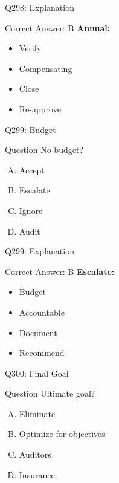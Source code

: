 \documentclass{beamer}
\begin{document}
	\begin{frame}{Q298: Explanation}
		\begin{block}{Correct Answer: B}
			\textbf{Annual:}
			\begin{itemize}
				\item Verify
				\item Compensating
				\item Close
				\item Re-approve
			\end{itemize}
		\end{block}
	\end{frame}
	
	\begin{frame}{Q299: Budget}
		\begin{block}{Question}
			No budget?
		\end{block}
		\begin{enumerate}[(A)]
			\item Accept
			\item Escalate
			\item Ignore
			\item Audit
		\end{enumerate}
	\end{frame}
	
	\begin{frame}{Q299: Explanation}
		\begin{block}{Correct Answer: B}
			\textbf{Escalate:}
			\begin{itemize}
				\item Budget
				\item Accountable
				\item Document
				\item Recommend
			\end{itemize}
		\end{block}
	\end{frame}
	
	\begin{frame}{Q300: Final Goal}
		\begin{block}{Question}
			Ultimate goal?
		\end{block}
		\begin{enumerate}[(A)]
			\item Eliminate
			\item Optimize for objectives
			\item Auditors
			\item Insurance
		\end{enumerate}
	\end{frame}
	
\end{document}
